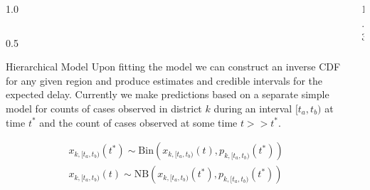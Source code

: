 \documentclass[final]{beamer}
\newlength{\onecolwid}
\begin{document}
\begin{frame}[t]
\begin{columns}[t]
\begin{column}{1.0\onecolwid}
\begin{columns}
\begin{column}{0.5\onecolwid}
\begin{block}{Hierarchical Model}
Upon fitting the model we can construct an inverse CDF for any given region and produce estimates and credible intervals for the expected delay.  Currently we make predictions based on a separate simple model for counts of cases observed in district $k$ during an interval $[t_a,t_b)$ at time $t^*$ and the count of cases observed at some time $t >> t^*$.

\begin{align*}
x_{k,[t_a,t_b)}(t^*) \sim \text{Bin}(x_{k, [t_a,t_b)}(t),p_{k, [t_a,t_b)}(t^*)) \\
x_{k,[t_a,t_b)}(t) \sim \text{NB}(x_{k,[t_a,t_b)}(t^*),p_{k,[t_a,t_b)}(t^*))
\end{align*}


\end{block}
\end{column}


\end{columns}






\end{column} %

\begin{column}{1.3\onecolwid} 

\begin{columns}


\end{columns}
\end{column}
\end{columns}
\end{frame}
\end{document}
